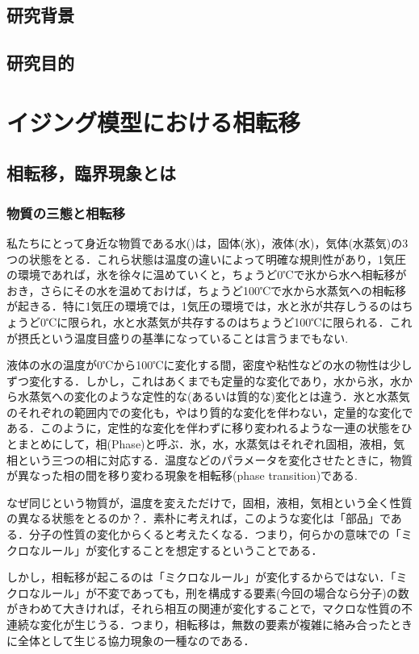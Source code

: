 \documentclass[a4paper,11pt]{jsreport}
\begin{document}
\section{研究背景}
\section{研究目的}


\chapter{イジング模型における相転移}
\section{相転移，臨界現象とは}
\subsection{物質の三態と相転移}
私たちにとって身近な物質である水()は，固体(氷)，液体(水)，気体(水蒸気)の3つの状態をとる．これら状態は温度の違いによって明確な規則性があり，1気圧の環境であれば，氷を徐々に温めていくと，ちょうど0℃で氷から水へ相転移がおき，さらにその水を温めておけば，ちょうど100℃で水から水蒸気への相転移が起きる．特に1気圧の環境では，1気圧の環境では，水と氷が共存しうるのはちょうど0℃に限られ，水と水蒸気が共存するのはちょうど100℃に限られる．これが摂氏という温度目盛りの基準になっていることは言うまでもない.\par
液体の水の温度が0℃から100℃に変化する間，密度や粘性などの水の物性は少しずつ変化する．しかし，これはあくまでも定量的な変化であり，水から氷，水から水蒸気への変化のような定性的な(あるいは質的な)変化とは違う．氷と水蒸気のそれぞれの範囲内での変化も，やはり質的な変化を伴わない，定量的な変化である．このように，定性的な変化を伴わずに移り変われるような一連の状態をひとまとめにして，相(Phase)と呼ぶ．氷，水，水蒸気はそれぞれ固相，液相，気相という三つの相に対応する．温度などのパラメータを変化させたときに，物質が異なった相の間を移り変わる現象を相転移(phase transition)である.\par
なぜ同じという物質が，温度を変えただけで，固相，液相，気相という全く性質の異なる状態をとるのか？．素朴に考えれば，このような変化は「部品」である．分子の性質の変化からくると考えたくなる．つまり，何らかの意味での「ミクロなルール」が変化することを想定するということである．\par
しかし，相転移が起こるのは「ミクロなルール」が変化するからではない．「ミクロなルール」が不変であっても，刑を構成する要素(今回の場合なら分子)の数がきわめて大きければ，それら相互の関連が変化することで，マクロな性質の不連続な変化が生じうる．つまり，相転移は，無数の要素が複雑に絡み合ったときに全体として生じる協力現象の一種なのである．
\end{document}
